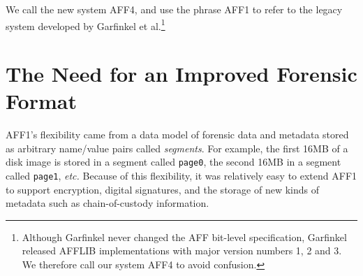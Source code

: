 \documentclass[10pt, conference]{IEEEtran}
\begin{document}
We call the new system AFF4, and use the phrase AFF1 to refer to the
legacy system developed by Garfinkel et al.\footnote{Although Garfinkel
never changed the AFF bit-level specification, Garfinkel released
AFFLIB implementations with major version numbers 1, 2 and 3. We
therefore call our system AFF4 to avoid confusion.}





\section{The Need for an Improved Forensic Format}

AFF1's flexibility came from a data model of forensic data and metadata
stored as arbitrary name/value pairs called \emph{segments}. For
example, the first 16MB of a disk image is stored in a segment called
\texttt{page0}, the second 16MB in a segment called \texttt{page1},
\emph{etc.} Because of this flexibility, it was relatively easy 
to extend AFF1 to support encryption, digital signatures, and the
storage of new kinds of metadata such as chain-of-custody
information\cite{garfinkel:affcrypto}.
\end{document}
